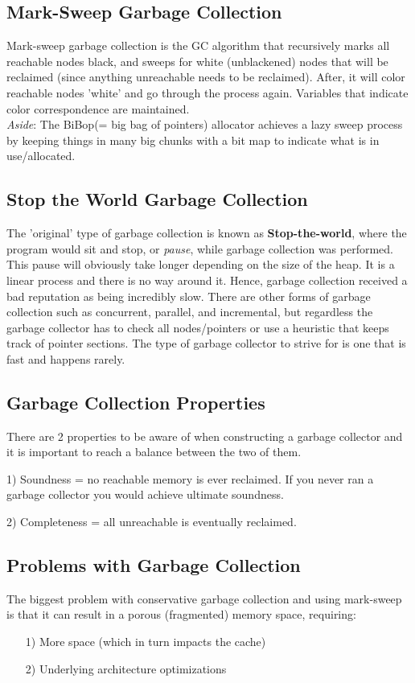 \documentclass[twoside]{article}
\begin{document}
\subsection{Mark-Sweep Garbage Collection}
Mark-sweep garbage collection is the GC algorithm that recursively marks all reachable nodes black, and sweeps for white (unblackened) nodes that will be reclaimed (since anything unreachable needs to be reclaimed). After, it will color reachable nodes 'white' and go through the process again. Variables that indicate color correspondence are maintained. \\

\emph{Aside}: The BiBop(= big bag of pointers) allocator achieves a lazy sweep process by keeping things in many big chunks with a bit map to indicate what is in use/allocated.
	
\subsection{Stop the World Garbage Collection}
The 'original' type of garbage collection is known as \textbf{Stop-the-world}, where the program would sit and stop, or \emph{pause}, while garbage collection was performed. This pause will obviously take longer depending on the size of the heap. It is a linear process and there is no way around it. Hence, garbage collection received a bad reputation as being incredibly slow. There are other forms of garbage collection such as concurrent, parallel, and incremental, but regardless the garbage collector has to check all nodes/pointers or use a heuristic that keeps track of pointer sections. The type of garbage collector to strive for is one that is fast and happens rarely.

\subsection{Garbage Collection Properties}
There are 2 properties to be aware of when constructing a garbage collector and it is important to reach a balance between the two of them.
\begin{description}
\item{1) Soundness} = no reachable memory is ever reclaimed. If you never ran a garbage collector you would achieve ultimate soundness.
\item{2) Completeness} = all unreachable is eventually reclaimed.
\end{description}


\subsection{Problems with Garbage Collection}
The biggest problem with conservative garbage collection and using mark-sweep is that it can result in a porous (fragmented) memory space, requiring:
\begin{enumerate}
\item[1)]More space (which in turn impacts the cache)
\item[2)] Underlying architecture optimizations
\end{enumerate}
\end{document}
